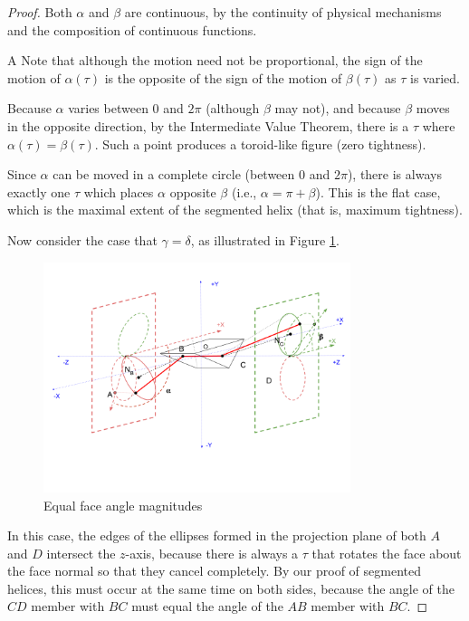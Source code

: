 \documentclass[11pt]{article}
\begin{document}
{\begin{proof}
    Both $\alpha$ and $\beta$ are continuous, by the continuity of
    physical mechanisms and the composition of continuous functions.

   A Note that although the motion need not be proportional, the sign
    of the motion of $\alpha(\tau)$ is the opposite of the sign of the
    motion of $\beta(\tau)$ as $\tau$ is varied.

    Because $\alpha$ varies between $0$ and $2\pi$ (although
    $\beta$ may not), and because $\beta$ moves in the opposite direction,
    by the Intermediate Value Theorem, there is a $\tau$ where
    $\alpha(\tau) = \beta(\tau)$. Such a point produces a toroid-like
    figure (zero tightness).

    Since $\alpha$ can be moved in a complete circle (between 0 and
    $2\pi$), there is always
    exactly one
    $\tau$ which places $\alpha$ opposite $\beta$
    (i.e., $\alpha = \pi + \beta$). This is the flat case, which
    is the maximal extent of the segmented helix (that is, maximum tightness).

    Now consider the case that $\gamma = \delta$, as illustrated
    in Figure \ref{fig:twistspectrumequal}.

    \begin{figure}
     \centering
     \includegraphics[width=0.80\textwidth]{figures/TwistSpectrumEqual.png}
     \caption{Equal face angle magnitudes}
  \label{fig:twistspectrumequal}
    \end{figure}

    In this case, the edges of the ellipses formed in the projection plane of both $A$ and $D$
    intersect
    the $z$-axis, because there is always a $\tau$ that rotates
    the face about the face normal so that they cancel completely. By our
    proof of segmented helices, this must occur at the same time on both sides,
    because the angle of the $CD$ member with $BC$ must equal the angle of the $AB$ member
    with $BC$.


\end{proof}}
\end{document}
